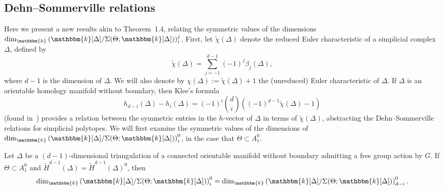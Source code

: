 \documentclass[ALCO,ThmDefs,Unicode]{cedram}
\newcommand{\field}{\mathbbm{k}}
\begin{document}
\subsection{Dehn--Sommerville relations} Here we present a new results akin to Theorem~1.4, relating the symmetric values of the dimensions $\dim_\field \left(\field[\Delta]/\Sigma(\Theta;\field[\Delta])\right)_i^j$. First, let $\tilde{\chi}(\Delta)$ denote the reduced Euler characteristic of a simplicial complex $\Delta$, defined by
\[
\tilde{\chi}(\Delta)=\sum_{j=-1}^{d-1}(-1)^j\beta_j(\Delta),
\]
where $d-1$ is the dimension of $\Delta$. We will also denote by $\chi(\Delta):=\tilde{\chi}(\Delta)+1$ the (unreduced) Euler characteristic of $\Delta$. If $\Delta$ is an orientable homology manifold without boundary, then Klee's formula
\begin{equation}\label{KleesFormula}
h_{d-i}(\Delta)-h_i(\Delta)=(-1)^i\binom{d}{i}((-1)^{d-1}\tilde{\chi}(\Delta)-1)
\end{equation}
(found in~\cite{Klee}) provides a relation between the symmetric entries in the $h$-vector of $\Delta$ in terms of $\tilde{\chi}(\Delta)$, abstracting the Dehn--Sommerville relations for simplicial polytopes. We will first examine the symmetric values of the dimensions of $\dim_\field \left(\field[\Delta]/\Sigma(\Theta;\field[\Delta])\right)_i^0$, in the case that $\Theta\subset A_1^0$.

\begin{theo}\label{DSTheorem}
Let $\Delta$ be a $(d-1)$-dimensional triangulation of a connected orientable manifold without boundary admitting a free group action by $G$. If $\Theta\subset A_1^0$ and $\widetilde{H}^{d-1}(\Delta)=\widetilde{H}^{d-1}(\Delta)^0$, then
\[
\dim_\field \left(\field[\Delta]/\Sigma(\Theta;\field[\Delta])\right)_i^0=\dim_\field \left(\field[\Delta]/\Sigma(\Theta;\field[\Delta])\right)_{d-i}^0.
\]
\end{theo}
\end{document}
